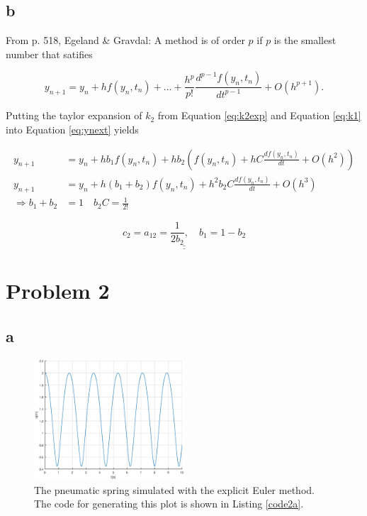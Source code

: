 \documentclass{article}
\begin{document}
\subsection{b}

From p. 518, Egeland \& Gravdal:
A method is of order $p$ if $p$ is the smallest number that satifies

\begin{equation}\label{eq:order}
	y_{n+1} = y_n + hf(y_n,t_n) + ... + \frac{h^p}{p!} \frac{d^{p-1}f(y_n,t_n)}{dt^{p-1}} + O(h^{p+1}).
\end{equation}

Putting the taylor expansion of $k_2$ from Equation \ref{eq:k2exp} and Equation \ref{eq:k1} into Equation \ref{eq:ynext} yields

\begin{align*}
	y_{n+1} &= y_n + hb_1f(y_n,t_n) + hb_2(f(y_n,t_n) + hC\frac{df(y_n,t_n)}{dt} + O(h^2))\\
	y_{n+1} &= y_n + h(b_1+b_2)f(y_n,t_n) + h^2b_2C\frac{df(y_n,t_n)}{dt} + O(h^3) \\
	\Rightarrow b_1+b_2 &= 1 \quad b_2C = \frac{1}{2!}
\end{align*}

\begin{equation*}
	\underline{\underline{c_2 = a_{12} = \frac{1}{2b_2}, \quad b_1 = 1-b_2}}
\end{equation*}


\section{Problem 2}

\subsection{a}

\begin{figure}[!ht]\label{fig:spring2a}
	\centering
	\includegraphics[width = 0.5\textwidth]{ModSim_ex4_2a}
    \caption{The pneumatic spring simulated with the explicit Euler method. The code for generating this plot is shown in Listing \ref{code2a}.}
\end{figure}
\end{document}
